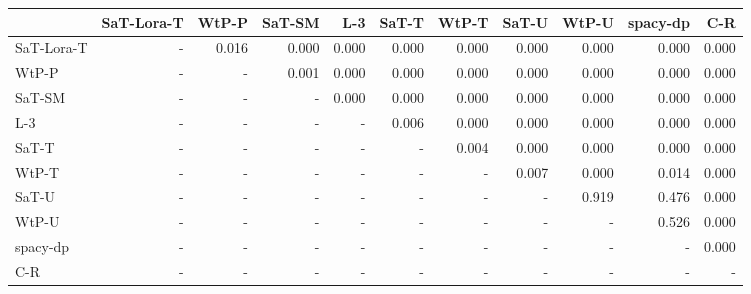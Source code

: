 \begin{tabular}{lrrrrrrrrrr}
\toprule
 & SaT-Lora-T & WtP-P & SaT-SM & L-3 & SaT-T & WtP-T & SaT-U & WtP-U & spacy-dp & C-R \\
\midrule
SaT-Lora-T & - & 0.016 & 0.000 & 0.000 & 0.000 & 0.000 & 0.000 & 0.000 & 0.000 & 0.000 \\
WtP-P & - & - & 0.001 & 0.000 & 0.000 & 0.000 & 0.000 & 0.000 & 0.000 & 0.000 \\
SaT-SM & - & - & - & 0.000 & 0.000 & 0.000 & 0.000 & 0.000 & 0.000 & 0.000 \\
L-3 & - & - & - & - & 0.006 & 0.000 & 0.000 & 0.000 & 0.000 & 0.000 \\
SaT-T & - & - & - & - & - & 0.004 & 0.000 & 0.000 & 0.000 & 0.000 \\
WtP-T & - & - & - & - & - & - & 0.007 & 0.000 & 0.014 & 0.000 \\
SaT-U & - & - & - & - & - & - & - & 0.919 & 0.476 & 0.000 \\
WtP-U & - & - & - & - & - & - & - & - & 0.526 & 0.000 \\
spacy-dp & - & - & - & - & - & - & - & - & - & 0.000 \\
C-R & - & - & - & - & - & - & - & - & - & - \\
\bottomrule
\end{tabular}

